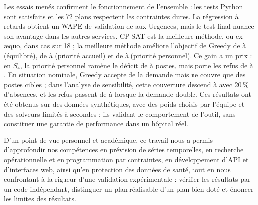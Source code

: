 \indent Les essais menés confirment le fonctionnement de l'ensemble : les \NbTestsPython{} tests Python sont satisfaits et les 72 plans respectent les contraintes dures. La régression à retards obtient un WAPE de validation de \WapeValUrg{} aux Urgences, mais le test final nuance son avantage dans les autres services. CP-SAT est la meilleure méthode, ou ex æquo, dans \NbCpMeilleur{} cas sur 18 ; la meilleure méthode améliore l'objectif de Greedy de \GainMinEq{} à \GainMaxEq{} (équilibré), de \GainMinAcc{} à \GainMaxAcc{} (priorité accueil) et de \GainMinPer{} à \GainMaxPer{} (priorité personnel). Ce gain a un prix : en $S_4$, la priorité personnel ramène le déficit de \DeficitGreedySq{} à \DeficitCpPerSq{} postes, mais porte les refus de \RefusGreedySq{} à \RefusCpPerSq{}. En situation nominale, Greedy accepte \CouvDemSzGreedy{} de la demande mais ne couvre que \CouvSzGreedy{} des postes cibles ; dans l'analyse de sensibilité, cette couverture descend à \SensCouvAbs{} avec 20\,\% d'absences, et les refus passent de \SensRefusBase{} à \SensRefusDx{} lorsque la demande double. Ces résultats ont été obtenus sur des données synthétiques, avec des poids choisis par l'équipe et des solveurs limités à \TempsSolveur{} secondes : ils valident le comportement de l'outil, sans constituer une garantie de performance dans un hôpital réel.

\indent D'un point de vue personnel et académique, ce travail nous a permis d'approfondir nos compétences en prévision de séries temporelles, en recherche opérationnelle et en programmation par contraintes, en développement d'API et d'interfaces web, ainsi qu'en protection des données de santé, tout en nous confrontant à la rigueur d'une validation expérimentale : vérifier les résultats par un code indépendant, distinguer un plan réalisable d'un plan bien doté et énoncer les limites des résultats.

